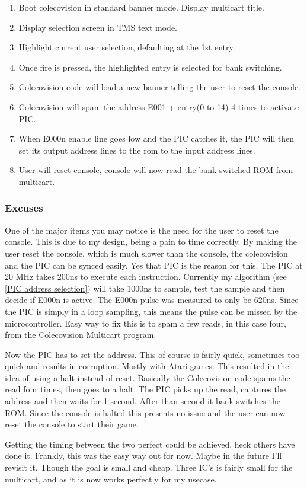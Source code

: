 \documentclass{article}
\begin{document}
  \begin{enumerate}
    \item Boot colecovision in standard banner mode. Display multicart title.
    \item Display selection screen in TMS text mode.
    \item Highlight current user selection, defaulting at the 1st entry.
    \item Once fire is pressed, the highlighted entry is selected for bank switching.
    \item Colecovision code will load a new banner telling the user to reset the console.
    \item Colecovision will spam the address E001 + entry(0 to 14) 4 times to activate PIC.
    \item When E000n enable line goes low and the PIC catches it, the PIC will then set its output address lines to the rom to the input address lines.
    \item User will reset console, console will now read the bank switched ROM from multicart.
  \end{enumerate}

  \subsubsection{Excuses}

  \par
  One of the major items you may notice is the need for the user to reset the console. This is due to my design, being a pain to time correctly.
  By making the user reset the console, which is much slower than the console, the colecovision and the PIC can be synced easily. Yes that PIC is the reason for this.
  The PIC at 20 MHz takes 200ns to execute each instruction. Currently my algorithm (see \ref{PIC address selection}) will take 1000ns to sample, test the sample and then
  decide if E000n is active. The E000n pulse was measured to only be 620ns. Since the PIC is simply in a loop sampling, this means the pulse can be missed by the
  microcontroller. Easy way to fix this is to spam a few reads, in this case four, from the Colecovision Multicart program.
  \par
  Now the PIC has to set the address. This of course is fairly quick, sometimes too quick and results in corruption. Mostly with Atari games. This resulted in the idea
  of using a halt instead of reset. Basically the Colecovision code spams the read four times, then goes to a halt. The PIC picks up the read, captures the address and
  then waits for 1 second. After than second it bank switches the ROM. Since the console is halted this presents no issue and the user can now reset the console to
  start their game.
  \par
  Getting the timing between the two perfect could be achieved, heck others have done it. Frankly, this was the easy way out for now. Maybe in the future I'll revisit it.
  Though the goal is small and cheap. Three IC's is fairly small for the multicart, and as it is now works perfectly for my usecase.
\end{document}
